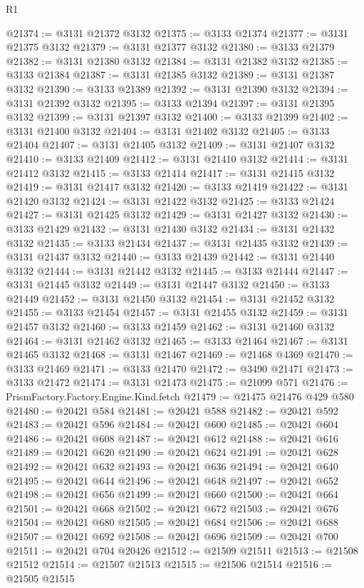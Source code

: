 \begin{lexlean}{R1}
\begin{coremodule}
@21374 := @3131 @21372 @3132
@21375 := @3133 @21374
@21377 := @3131 @21375 @3132
@21379 := @3131 @21377 @3132
@21380 := @3133 @21379
@21382 := @3131 @21380 @3132
@21384 := @3131 @21382 @3132
@21385 := @3133 @21384
@21387 := @3131 @21385 @3132
@21389 := @3131 @21387 @3132
@21390 := @3133 @21389
@21392 := @3131 @21390 @3132
@21394 := @3131 @21392 @3132
@21395 := @3133 @21394
@21397 := @3131 @21395 @3132
@21399 := @3131 @21397 @3132
@21400 := @3133 @21399
@21402 := @3131 @21400 @3132
@21404 := @3131 @21402 @3132
@21405 := @3133 @21404
@21407 := @3131 @21405 @3132
@21409 := @3131 @21407 @3132
@21410 := @3133 @21409
@21412 := @3131 @21410 @3132
@21414 := @3131 @21412 @3132
@21415 := @3133 @21414
@21417 := @3131 @21415 @3132
@21419 := @3131 @21417 @3132
@21420 := @3133 @21419
@21422 := @3131 @21420 @3132
@21424 := @3131 @21422 @3132
@21425 := @3133 @21424
@21427 := @3131 @21425 @3132
@21429 := @3131 @21427 @3132
@21430 := @3133 @21429
@21432 := @3131 @21430 @3132
@21434 := @3131 @21432 @3132
@21435 := @3133 @21434
@21437 := @3131 @21435 @3132
@21439 := @3131 @21437 @3132
@21440 := @3133 @21439
@21442 := @3131 @21440 @3132
@21444 := @3131 @21442 @3132
@21445 := @3133 @21444
@21447 := @3131 @21445 @3132
@21449 := @3131 @21447 @3132
@21450 := @3133 @21449
@21452 := @3131 @21450 @3132
@21454 := @3131 @21452 @3132
@21455 := @3133 @21454
@21457 := @3131 @21455 @3132
@21459 := @3131 @21457 @3132
@21460 := @3133 @21459
@21462 := @3131 @21460 @3132
@21464 := @3131 @21462 @3132
@21465 := @3133 @21464
@21467 := @3131 @21465 @3132
@21468 := @3131 @21467
@21469 := @21468 @4369
@21470 := @3133 @21469
@21471 := @3133 @21470
@21472 := @3490 @21471
@21473 := @3133 @21472
@21474 := @3131 @21473
@21475 := @21099 @571
@21476 := PrismFactory.Factory.Engine.Kind.fetch
@21479 := @21475 @21476 @429 @580
@21480 := @20421 @584
@21481 := @20421 @588
@21482 := @20421 @592
@21483 := @20421 @596
@21484 := @20421 @600
@21485 := @20421 @604
@21486 := @20421 @608
@21487 := @20421 @612
@21488 := @20421 @616
@21489 := @20421 @620
@21490 := @20421 @624
@21491 := @20421 @628
@21492 := @20421 @632
@21493 := @20421 @636
@21494 := @20421 @640
@21495 := @20421 @644
@21496 := @20421 @648
@21497 := @20421 @652
@21498 := @20421 @656
@21499 := @20421 @660
@21500 := @20421 @664
@21501 := @20421 @668
@21502 := @20421 @672
@21503 := @20421 @676
@21504 := @20421 @680
@21505 := @20421 @684
@21506 := @20421 @688
@21507 := @20421 @692
@21508 := @20421 @696
@21509 := @20421 @700
@21511 := @20421 @704 @20426
@21512 := @21509 @21511
@21513 := @21508 @21512
@21514 := @21507 @21513
@21515 := @21506 @21514
@21516 := @21505 @21515

\end{coremodule}
\end{lexlean}

